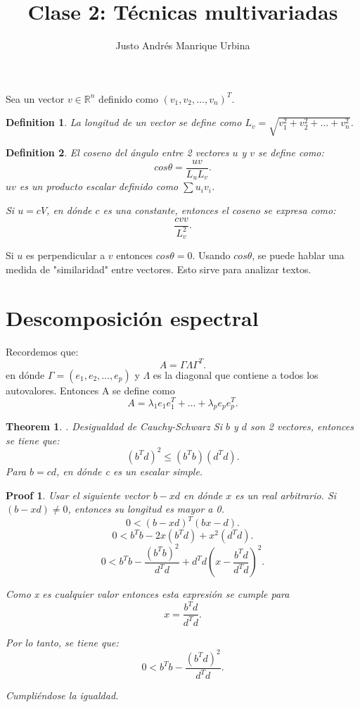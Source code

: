 \documentclass{article}
\title{Clase 2: Técnicas multivariadas}
\author{Justo Andrés Manrique Urbina}
\newtheorem{mydef}{Definition}
\newtheorem{mythm}{Theorem}
\newtheorem{myprf}{Proof}
\begin{document}
\maketitle
Sea un vector $v \in \mathbb{R}^{n}$ definido como $(v_{1},v_{2},\ldots,v_{n})^{T}$. 
\begin{mydef}
	La longitud de un vector se define como $L_{v}=\sqrt{v_{1}^{2}+v_{2}^{2}+\ldots+v_{n}^{2}}$.
\end{mydef}
\begin{mydef}
El coseno del ángulo entre 2 vectores $u$ y $v$ se define como:
\[ cos \theta = \frac{uv}{L_{u}L_{v}}.\]
$uv$ es un producto escalar definido como $\sum u_{i}v_{i}$.

Si $u=cV$, en dónde $c$ es una constante, entonces el coseno se expresa como:
\[ \frac{cvv}{L_{v}^{2}}.\]
\end{mydef}

Si $u$ es perpendicular a $v$ entonces $cos \theta =0$. Usando $cos \theta$, se puede hablar una medida de "similaridad" entre vectores. Esto sirve para analizar textos.

\section{Descomposición espectral}
Recordemos que:
\[ A = \Gamma \Lambda \Gamma^{T}.\]
en dónde $\Gamma=(e_{1},e_{2},\ldots,e_{p})$ y $\Lambda$ es la diagonal que contiene a todos los autovalores. Entonces A se define como
\[ A=\lambda_{1}e_{1}e_{1}^{T}+\ldots+\lambda_{p}e_{p}e_{p}^{T}.\]
\begin{mythm}. Desigualdad de Cauchy-Schwarz
Si $b$ y $d$ son 2 vectores, entonces se tiene que:
\[ {(b^{T}d)}^{2} \leq (b^{T}b)(d^{T}d).\]
Para $b=cd$, en dónde c es un escalar simple.
\end{mythm}
\begin{myprf}
	Usar el siguiente vector $b-xd$ en dónde $x$ es un real arbitrario. Si $(b-xd)\neq0$, entonces su longitud es mayor a 0.
	\[ 0 < (b-xd)^{T}(bx-d).\]
	\[ 0 < b^{T}b-2x(b^{T}d)+x^{2}(d^{T}d).\]
	\[ 0 < b^{T}b-\frac{(b^{T}b)^{2}}{d^{T}d}+d^{T}d(x-\frac{b^{T}d}{d^{T}d})^{2}.\]

	Como x es cualquier valor entonces esta expresión se cumple para
	\[ x=\frac{b^{T}d}{d^{T}d}.\]
	
	Por lo tanto, se tiene que:
	\[ 0 < b^{T}b-\frac{(b^{T}d)^{2}}{d^{T}d}.\]

	Cumpliéndose la igualdad.
\end{myprf}
\end{document}
